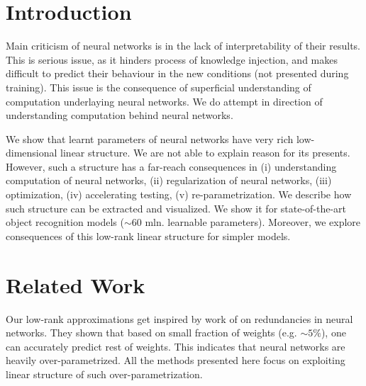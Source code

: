 \documentclass{article}
\begin{document}
 




\begin{abstract}

\end{abstract}

\section{Introduction}
Main criticism of neural networks is in the lack of interpretability of their results. This is serious issue,
as it hinders process of knowledge injection, and makes difficult to predict their behaviour in the new conditions (not
presented during training). This issue is the consequence of superficial understanding of computation 
underlaying neural networks. We do attempt in direction of understanding computation behind neural networks.


We show that learnt parameters of neural networks have very
rich low-dimensional linear structure. We are not able to explain reason for its presents. However, 
such a structure has a far-reach consequences in (i) understanding computation of neural networks, 
(ii) regularization of neural networks, (iii) optimization, (iv) accelerating testing, (v) re-parametrization.
We describe how such structure can be extracted and visualized. We show it for state-of-the-art object recognition models ($\sim60$ mln. 
learnable parameters). Moreover, we explore consequences of this low-rank linear structure for simpler models. 


\section{Related Work}


Our low-rank approximations get inspired by work of \cite{denil2013predicting} on redundancies in neural 
networks. They shown that based on small fraction of weights (e.g. $\sim 5\%$), one can accurately 
predict rest of weights. This indicates that neural networks are heavily over-parametrized.
All the methods presented here focus on exploiting linear structure of such over-parametrization.
\end{document}
